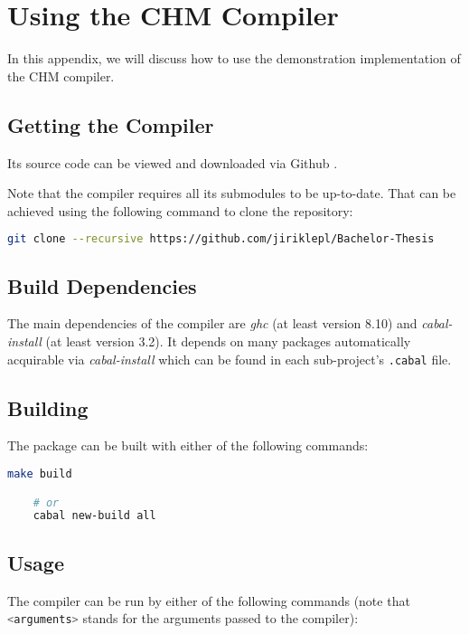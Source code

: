 \chapter{Using the CHM Compiler}

In this appendix, we will discuss how to use the demonstration implementation of the CHM compiler.

\section{Getting the Compiler}

Its source code can be viewed and downloaded via Github \cite{jiriklepl2020chmcompiler}.

Note that the compiler requires all its submodules to be up-to-date. That can be achieved using the following command to clone the repository:

\begin{lstlisting}[language=sh]
    git clone --recursive https://github.com/jiriklepl/Bachelor-Thesis
\end{lstlisting}

\section{Build Dependencies}

The main dependencies of the compiler are \emph{ghc} (at least version 8.10) and \emph{cabal-install} (at least version 3.2). It depends on many packages automatically acquirable via \emph{cabal-install} which can be found in each sub-project's \lstinline{.cabal} file.

\section{Building}

The package can be built with either of the following commands:

\begin{lstlisting}[language=sh]
    make build

    # or
    cabal new-build all
\end{lstlisting}


\section{Usage}

The compiler can be run by either of the following commands (note that \lstinline[language=sh]{<arguments>} stands for the arguments passed to the compiler):


